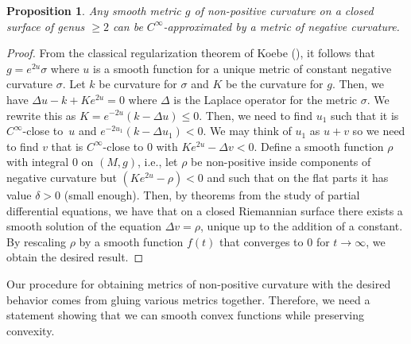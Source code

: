 \documentclass[12pt]{article}
\numberwithin{equation}{section}
\newtheorem{prop}[lem]{Proposition}
\theoremstyle{definition}
\begin{document}
\begin{prop}\label{prop:approx}
Any smooth metric $g$ of non-positive curvature on a closed surface of genus $\geqslant 2$ can be $C^\infty$-approximated by a metric of negative curvature.
\end{prop}
\begin{proof}
    From the classical regularization theorem of Koebe (\cite{SS54}), it follows that $g = e^{2u}\sigma$ where $u$ is a smooth function for a unique metric of  constant negative curvature $\sigma$. Let $k$ be curvature for $\sigma$ and $K$ be the curvature for $g$. Then, we have $\Delta u - k + Ke^{2u} = 0$ where $\Delta$ is the Laplace operator for the metric $\sigma$. We rewrite this as $K = e^{-2u}(k-\Delta u)\leqslant 0$. Then, we need to find $u_1$ such that it is $C^\infty$-close to~$u$ and $e^{-2u_1}(k-\Delta u_1) < 0$. We may think of $u_1$ as $u+v$ so we need to find $v$ that is $C^\infty$-close to $0$ with $Ke^{2u}-\Delta v <0$. Define a smooth function $\rho$ with integral $0$ on $(M, g)$, i.e., let $\rho$ be non-positive inside components of negative curvature but $(Ke^{2u}-\rho)<0$ and such that on the flat parts it has value $\delta>0$ (small enough). Then, by theorems from the study of partial differential equations, we have that on a closed Riemannian surface there exists a smooth solution of the equation $\Delta v = \rho$, unique up to the addition of a constant. By rescaling $\rho$ by a smooth function $f(t)$ that converges to $0$ for $t\rightarrow\infty$, we obtain the desired result.
\end{proof}

Our procedure for obtaining metrics of non-positive curvature with the desired behavior comes from gluing various metrics together. Therefore, we need a statement showing that we can smooth convex functions while preserving convexity.
\end{document}

